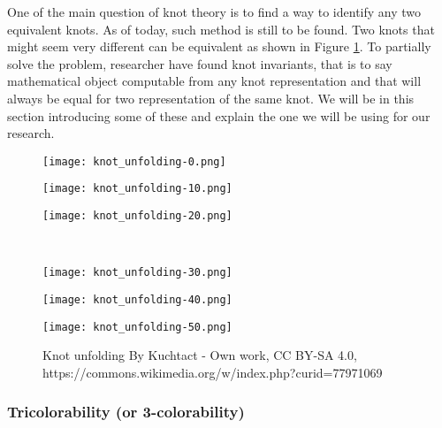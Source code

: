 \documentclass[12pt, a4paper]{article}
\begin{document}
One of the main question of knot theory is to find a way to identify any two equivalent knots. As of today, such method is still to be found. Two knots that might seem very different can be equivalent as shown in Figure \ref{fig:unknot}. To partially solve the problem, researcher have found knot invariants, that is to say mathematical object computable from any knot representation and that will always be equal for two representation of the same knot. We will be in this section introducing some of these and explain the one we will be using for our research.\\

\begin{figure}[H]
  \begin{minipage}[c]{.2\textwidth}
  \centering
  \texttt{[image: knot\_unfolding-0.png]}
    
  \end{minipage}
  \hfill
  \begin{minipage}[c]{.2\textwidth}
  \centering
  \texttt{[image: knot\_unfolding-10.png]}
    
  \end{minipage}
  \hfill
  \begin{minipage}[c]{.2\textwidth}
  \centering
  \texttt{[image: knot\_unfolding-20.png]}
    
  \end{minipage}\\
  \begin{minipage}[c]{.2\textwidth}
  \centering
  \texttt{[image: knot\_unfolding-30.png]}
    
  \end{minipage}
  \hfill
  \begin{minipage}[c]{.2\textwidth}
  \centering
  \texttt{[image: knot\_unfolding-40.png]}
    
  \end{minipage}
  \hfill
  \begin{minipage}[c]{.2\textwidth}
  \centering
  \texttt{[image: knot\_unfolding-50.png]}
    
  \end{minipage}
  \caption{Knot unfolding By Kuchtact - Own work, CC BY-SA 4.0, https://commons.wikimedia.org/w/index.php?curid=77971069}
  \label{fig:unknot}
  
\end{figure}

\subsubsection{Tricolorability (or 3-colorability)}
\end{document}
